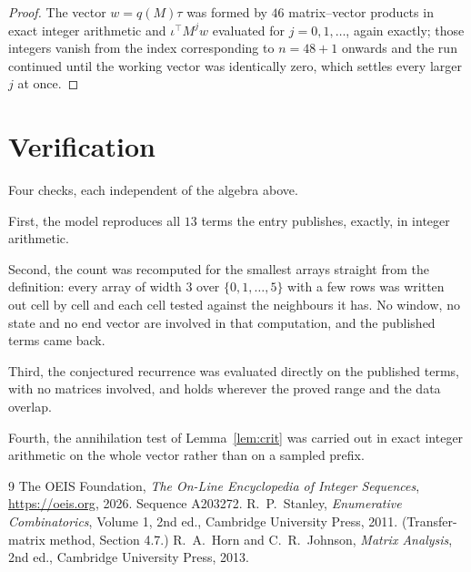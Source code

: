 \documentclass[11pt,a4paper]{article}
\theoremstyle{plain}
\theoremstyle{definition}
\begin{document}
\begin{proof}
The vector $w=q(M)\tau$ was formed by $46$ matrix--vector products in exact integer
arithmetic and $\iota^{\!\top}M^{j}w$ evaluated for $j=0,1,\dots$, again exactly; those
integers vanish from the index corresponding to $n=48+1$ onwards and the run continued
until the working vector was identically zero, which settles every larger $j$ at once.
\end{proof}

\section{Verification}

Four checks, each independent of the algebra above.

First, the model reproduces all $13$ terms the entry publishes, exactly, in integer
arithmetic.

Second, the count was recomputed for the smallest arrays straight from the definition: every
array of width $3$ over $\{0,1,\dots,5\}$ with a few rows was written out cell by cell and each cell
tested against the neighbours it has. No window, no state and no end vector are involved in that
computation, and the published terms came back.

Third, the conjectured recurrence was evaluated directly on the published terms, with no
matrices involved, and holds wherever the proved range and the data overlap.

Fourth, the annihilation test of Lemma~\ref{lem:crit} was carried out in exact integer
arithmetic on the whole vector rather than on a sampled prefix.

\begin{thebibliography}{9}
 The OEIS Foundation, \emph{The On-Line Encyclopedia of Integer
Sequences}, \url{https://oeis.org}, 2026. Sequence A203272.
 R.~P.~Stanley, \emph{Enumerative Combinatorics}, Volume 1, 2nd ed.,
Cambridge University Press, 2011. (Transfer-matrix method, Section 4.7.)
 R.~A.~Horn and C.~R.~Johnson, \emph{Matrix Analysis}, 2nd ed., Cambridge
University Press, 2013.
\end{thebibliography}
\end{document}
